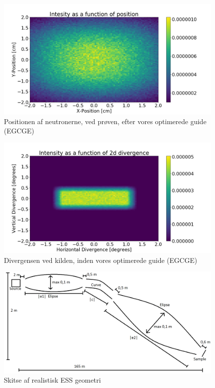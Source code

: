 \documentclass[12pt,oneside,a4paper]{article}
\begin{document}
{{{{{\begin{figure}[H]
\centering
\includegraphics[width=1\textwidth]{psd_after_ess_brill_optimized.png}
\caption{Positionen af neutronerne, ved prøven, efter vores optimerede guide (EGCGE)}
\end{figure}

\begin{figure}[H]
\centering
\includegraphics[width=1\textwidth]{div_before_ess_brill_optimized.png}
\caption{Divergensen ved kilden, inden vores optimerede guide (EGCGE)}
\end{figure}

\begin{figure}[H]
\centering
\includegraphics[width=1.6\textwidth, angle=90]{EGCGE.png}
\caption{Skitse af realistisk ESS geometri} \label{Skitse_EGCGE_ja}
\end{figure}

}}}}}
\end{document}
